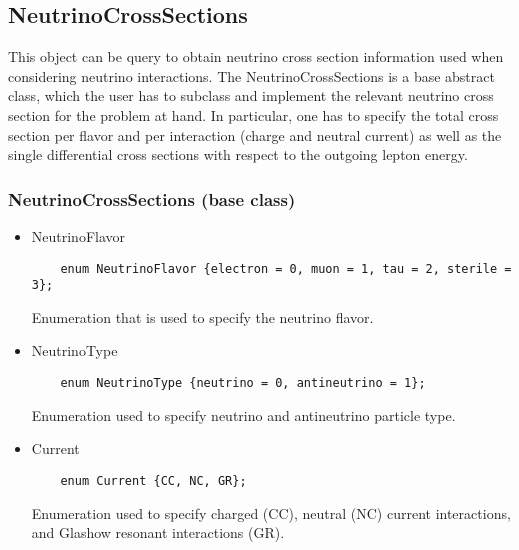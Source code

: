 \subsection{NeutrinoCrossSections}

This object can be query to obtain neutrino cross section information used when considering neutrino interactions. The {\ttf NeutrinoCrossSections} is a base abstract class, which the user has to subclass and implement the relevant neutrino cross section for the problem at hand. In particular, one has to specify the total cross section per flavor and per interaction (charge and neutral current) as well as the single differential cross sections with respect to the outgoing lepton energy.

\subsubsection{NeutrinoCrossSections (base class)}


\begin{itemize}
  \item {\ttf NeutrinoFlavor}
  \begin{lstlisting}
    enum NeutrinoFlavor {electron = 0, muon = 1, tau = 2, sterile = 3};
  \end{lstlisting}
  Enumeration that is used to specify the neutrino flavor.
  \item {\ttf NeutrinoType}
  \begin{lstlisting}
    enum NeutrinoType {neutrino = 0, antineutrino = 1};
  \end{lstlisting}
  Enumeration used to specify {\ttf neutrino} and {\ttf antineutrino} particle type.
  \item {\ttf Current}
  \begin{lstlisting}
    enum Current {CC, NC, GR};
  \end{lstlisting}
  Enumeration used to specify charged ({\ttf CC}), neutral ({\ttf NC}) current interactions, 
  and Glashow resonant interactions ({\ttf GR}).
\end{itemize}



